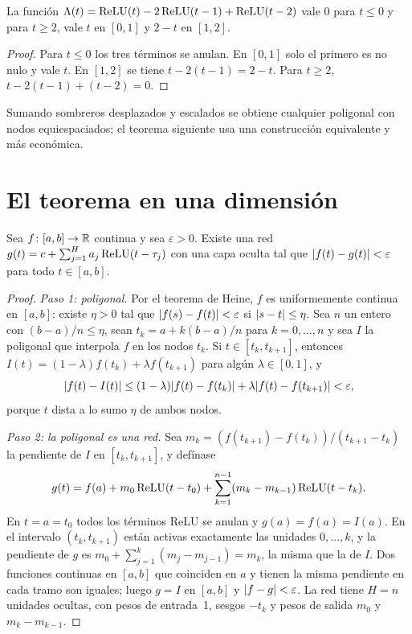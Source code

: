 \begin{lema}[Sombrero]\label{lem:sombrero}
La función $\Lambda(t)=\operatorname{ReLU}(t)-2\operatorname{ReLU}(t-1)+\operatorname{ReLU}(t-2)$ vale $0$ para $t\le 0$ y para $t\ge 2$, vale $t$ en $[0,1]$ y $2-t$ en $[1,2]$.
\end{lema}

\begin{proof}
Para $t\le 0$ los tres términos se anulan. En $[0,1]$ solo el primero es no nulo y vale $t$. En $[1,2]$ se tiene $t-2(t-1)=2-t$. Para $t\ge 2$, $t-2(t-1)+(t-2)=0$.
\end{proof}

Sumando sombreros desplazados y escalados se obtiene cualquier poligonal con nodos equiespaciados; el teorema siguiente usa una construcción equivalente y más económica.

\section{El teorema en una dimensión}

\begin{teorema}\label{teo:au1d}
Sea $f\colon[a,b]\to\mathbb{R}$ continua y sea $\varepsilon>0$. Existe una red $g(t)=c+\sum_{j=1}^{H}a_j\operatorname{ReLU}(t-\tau_j)$ con una capa oculta tal que $\lvert f(t)-g(t)\rvert<\varepsilon$ para todo $t\in[a,b]$.
\end{teorema}

\begin{proof}
\emph{Paso 1: poligonal.} Por el teorema de Heine, $f$ es uniformemente continua en $[a,b]$: existe $\eta>0$ tal que $\lvert f(s)-f(t)\rvert<\varepsilon$ si $\lvert s-t\rvert\le\eta$. Sea $n$ un entero con $(b-a)/n\le\eta$, sean $t_k=a+k(b-a)/n$ para $k=0,\dots,n$ y sea $I$ la poligonal que interpola $f$ en los nodos $t_k$. Si $t\in[t_k,t_{k+1}]$, entonces $I(t)=(1-\lambda)f(t_k)+\lambda f(t_{k+1})$ para algún $\lambda\in[0,1]$, y
\[
\lvert f(t)-I(t)\rvert\le(1-\lambda)\lvert f(t)-f(t_k)\rvert+\lambda\lvert f(t)-f(t_{k+1})\rvert<\varepsilon,
\]
porque $t$ dista a lo sumo $\eta$ de ambos nodos.

\emph{Paso 2: la poligonal es una red.} Sea $m_k=(f(t_{k+1})-f(t_k))/(t_{k+1}-t_k)$ la pendiente de $I$ en $[t_k,t_{k+1}]$, y defínase
\[
g(t)=f(a)+m_0\operatorname{ReLU}(t-t_0)+\sum_{k=1}^{n-1}(m_k-m_{k-1})\operatorname{ReLU}(t-t_k).
\]
En $t=a=t_0$ todos los términos ReLU se anulan y $g(a)=f(a)=I(a)$. En el intervalo $(t_k,t_{k+1})$ están activas exactamente las unidades $0,\dots,k$, y la pendiente de $g$ es $m_0+\sum_{j=1}^{k}(m_j-m_{j-1})=m_k$, la misma que la de $I$. Dos funciones continuas en $[a,b]$ que coinciden en $a$ y tienen la misma pendiente en cada tramo son iguales; luego $g=I$ en $[a,b]$ y $\lvert f-g\rvert<\varepsilon$. La red tiene $H=n$ unidades ocultas, con pesos de entrada~1, sesgos $-t_k$ y pesos de salida $m_0$ y $m_k-m_{k-1}$.
\end{proof}

